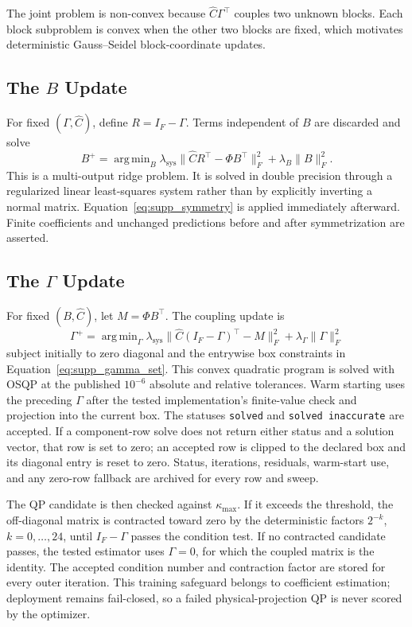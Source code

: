 \documentclass[a4paper,fleqn]{cas-sc}
\DeclareMathOperator*{\argminop}{arg\,min}
\begin{document}
The joint problem is non-convex because $\widehat C\Gamma^\top$ couples two unknown blocks. Each block subproblem is convex when the other two blocks are fixed, which motivates deterministic Gauss--Seidel block-coordinate updates.

\subsection{The $B$ Update}

For fixed $(\Gamma,\widehat C)$, define $R=I_F-\Gamma$. Terms independent of $B$ are discarded and solve
\begin{equation}
\label{eq:supp_b_update}
B^+=\argminop_B
\lambda_{\mathrm{sys}}\|\widehat C R^\top-\Phi B^\top\|_F^2
+\lambda_B\|B\|_F^2.
\end{equation}
This is a multi-output ridge problem. It is solved in double precision through a regularized linear least-squares system rather than by explicitly inverting a normal matrix. Equation~\eqref{eq:supp_symmetry} is applied immediately afterward. Finite coefficients and unchanged predictions before and after symmetrization are asserted.

\subsection{The $\Gamma$ Update}

For fixed $(B,\widehat C)$, let $M=\Phi B^\top$. The coupling update is
\begin{equation}
\label{eq:supp_gamma_update}
\Gamma^+=\argminop_{\Gamma}
\lambda_{\mathrm{sys}}\|\widehat C(I_F-\Gamma)^\top-M\|_F^2
+\lambda_\Gamma\|\Gamma\|_F^2
\end{equation}
subject initially to zero diagonal and the entrywise box constraints in Equation~\eqref{eq:supp_gamma_set}. This convex quadratic program is solved with OSQP at the published $10^{-6}$ absolute and relative tolerances. Warm starting uses the preceding $\Gamma$ after the tested implementation's finite-value check and projection into the current box. The statuses \texttt{solved} and \texttt{solved inaccurate} are accepted. If a component-row solve does not return either status and a solution vector, that row is set to zero; an accepted row is clipped to the declared box and its diagonal entry is reset to zero. Status, iterations, residuals, warm-start use, and any zero-row fallback are archived for every row and sweep.

The QP candidate is then checked against $\kappa_{\max}$. If it exceeds the threshold, the off-diagonal matrix is contracted toward zero by the deterministic factors $2^{-k}$, $k=0,\ldots,24$, until $I_F-\Gamma$ passes the condition test. If no contracted candidate passes, the tested estimator uses $\Gamma=0$, for which the coupled matrix is the identity. The accepted condition number and contraction factor are stored for every outer iteration. This training safeguard belongs to coefficient estimation; deployment remains fail-closed, so a failed physical-projection QP is never scored by the optimizer.
\end{document}
